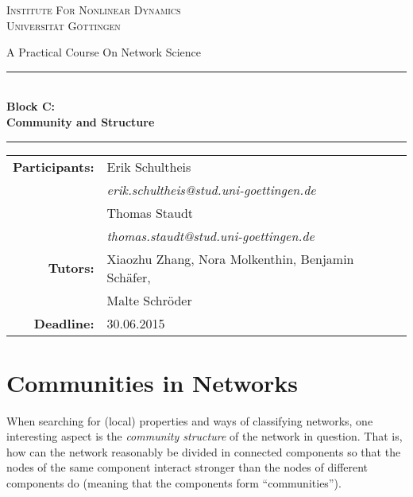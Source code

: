 \documentclass{scrartcl}
\begin{document}
\begin{titlepage}\centering
\textsc{\Large Institute For Nonlinear Dynamics \\[1.5ex] Universität Göttingen}

\vspace*{2cm}
{\huge A Practical Course On Network Science}
\vspace*{2cm}

\rule{\textwidth}{1pt}\\[0.5cm]
{\bfseries \huge Block C: \\[0.5cm] \huge \bfseries Community and Structure\\[0.5cm]}
\rule{\textwidth}{1pt}

\vspace*{4cm}

\begin{Large}\begin{tabular}{rl}
        \textbf{Participants:}  & Erik Schultheis                                \\    
                   & \textit{erik.schultheis@stud.uni-goettingen.de}\\[0.5cm]
                   & Thomas Staudt                                  \\
                   & \textit{thomas.staudt@stud.uni-goettingen.de}  \\[1.0cm]

       \textbf{Tutors:}        & Xiaozhu Zhang, Nora Molkenthin, Benjamin Schäfer, \\
                               & Malte Schröder                                    \\[1.0cm]
       \textbf{Deadline:}      & 30.06.2015
\end{tabular}\end{Large}

\vspace*{1.5cm}


\end{titlepage}

\tableofcontents
\clearpage
\section{Communities in Networks}
When searching for (local) properties and ways of classifying networks, one
interesting aspect is the \emph{community structure} of the network in
question. That is, how can the network reasonably be divided in connected
components so that the nodes of the same component interact stronger than
the nodes of different components do (meaning that the components form
\enquote{communities}).
\end{document}
